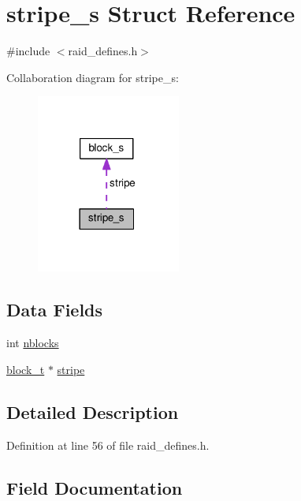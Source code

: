 \hypertarget{structstripe__s}{}\section{stripe\+\_\+s Struct Reference}
\label{structstripe__s}


{\ttfamily \#include $<$raid\+\_\+defines.\+h$>$}



Collaboration diagram for stripe\+\_\+s\+:
\nopagebreak
\begin{figure}[H]
\begin{center}
\leavevmode
\includegraphics[width=134pt]{structstripe__s__coll__graph}
\end{center}
\end{figure}
\subsection*{Data Fields}
\begin{DoxyCompactItemize}
\item 
int \hyperlink{structstripe__s_a076c8e8b7f7acccc46cd356bd8776b26}{nblocks}
\item 
\hyperlink{raid__defines_8h_a9497df9c1d65b018066a9760da7be4e6}{block\+\_\+t} $\ast$ \hyperlink{structstripe__s_a16ff6d534dd4944c7fc544e4247e5ff1}{stripe}
\end{DoxyCompactItemize}


\subsection{Detailed Description}


Definition at line 56 of file raid\+\_\+defines.\+h.



\subsection{Field Documentation}
\mbox{\label{structstripe__s_a076c8e8b7f7acccc46cd356bd8776b26}} 

